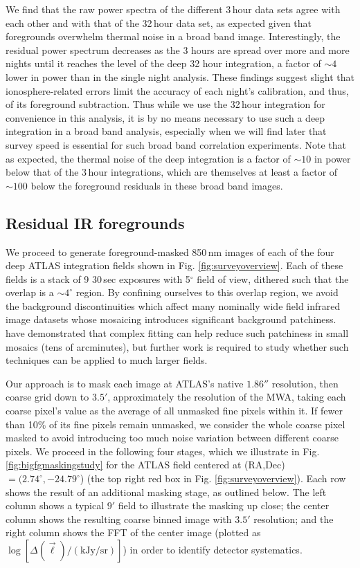 \documentclass[numberedappendix]{emulateapj}
\begin{document}
We find that the raw power spectra of the different 3\,hour data sets agree with each other and with that of the 32\,hour data set, as expected given that foregrounds overwhelm thermal noise in a broad band image. Interestingly, the residual power spectrum decreases as the 3 hours are spread over more and more nights until it reaches the level of the deep 32 hour integration, a factor of $\sim4$ lower in power than in the single night analysis. These findings suggest slight that ionosphere-related errors limit the accuracy of each night's calibration, and thus, of its foreground subtraction. Thus while we use the 32\,hour integration for convenience in this analysis, it is by no means necessary to use such a deep integration in a broad band analysis, especially when we will find later that survey speed is essential for such broad band correlation experiments. Note that as expected, the thermal noise of the deep integration is a factor of $\sim10$ in power below that of the 3\,hour integrations, which are themselves at least a factor of $\sim100$ below the foreground residuals in these broad band images.

\subsection{Residual IR foregrounds}
\label{sec:resirfg}

We proceed to generate foreground-masked 850\,nm images of each of the four deep ATLAS integration fields shown in Fig. \ref{fig:surveyoverview}. Each of these fields is a stack of 9 30\,sec exposures with 5$^\circ$ field of view, dithered such that the overlap is a $\sim4^\circ$ region. By confining ourselves to this overlap region, we avoid the background discontinuities which affect many nominally wide field infrared image datasets whose mosaicing introduces significant background patchiness. \citet{mw15} have demonstrated that complex fitting \citep{fixen00} can help reduce such patchiness in small mosaics (tens of arcminutes), but further work is required to study whether such techniques can be applied to much larger fields.

Our approach is to mask each image at ATLAS's native $1.86''$ resolution, then coarse grid down to $3.5'$, approximately the resolution of the MWA, taking each coarse pixel's value as the average of all unmasked fine pixels within it. If fewer than 10\% of its fine pixels remain unmasked, we consider the whole coarse pixel masked to avoid introducing too much noise variation between different coarse pixels. We proceed in the following four stages, which we illustrate in Fig. \ref{fig:bigfgmaskingstudy} for the ATLAS field centered at (RA,Dec)$=(2.74^\circ, -24.79^\circ$) (the top right red box in Fig. \ref{fig:surveyoverview}). Each row shows the result of an additional masking stage, as outlined below. The left column shows a typical $9'$ field to illustrate the masking up close; the center column shows the resulting coarse binned image with $3.5'$ resolution; and the right column shows the FFT of the center image (plotted as $\log[\Delta(\vec{\ell})/(\text{kJy/sr})]$) in order to identify detector systematics. 
\end{document}
